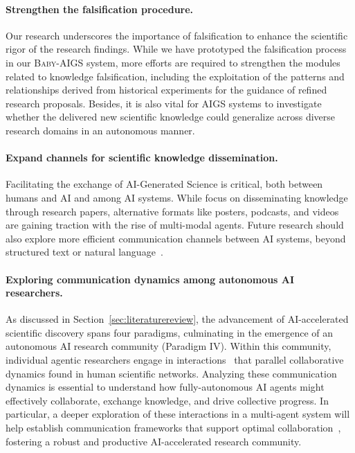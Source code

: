 \documentclass{article} %
\newcommand{\AIGSFull}{AI-Generated Science\xspace}
\newcommand{\AIGS}{AIGS\xspace}
\newcommand{\AIGSSys}{\textsc{Baby-AIGS}\xspace}
\begin{document}
\paragraph{Strengthen the falsification procedure.}
Our research underscores the importance of falsification to enhance the scientific rigor of the research findings.
While we have prototyped the falsification process in our \AIGSSys system, more efforts are required to strengthen the modules related to knowledge falsification, including the exploitation of the patterns and relationships derived from historical experiments for the guidance of refined research proposals.
Besides, it is also vital for \AIGS systems to investigate whether the delivered new scientific knowledge could generalize across diverse research domains in an autonomous manner.

\paragraph{Expand channels for scientific knowledge dissemination.}
Facilitating the exchange of \AIGSFull is critical, both between humans and AI and among AI systems.
While \citet{lu2024aiscientist} focus on disseminating knowledge through research papers, alternative formats like posters, podcasts, and videos are gaining traction with the rise of multi-modal agents.
Future research should also explore more efficient communication channels between AI systems, beyond structured text or natural language~\citep{pham2023let,chen2024beyond}.

\paragraph{Exploring communication dynamics among autonomous AI researchers.}
As discussed in Section~\ref{sec:literaturereview}, the advancement of AI-accelerated scientific discovery spans four paradigms, culminating in the emergence of an autonomous AI research community (Paradigm IV).
Within this community, individual agentic researchers engage in interactions~\citep{yang2024react} that parallel collaborative dynamics found in human scientific networks.
Analyzing these communication dynamics is essential to understand how fully-autonomous AI agents might effectively collaborate, exchange knowledge, and drive collective progress.
In particular, a deeper exploration of these interactions in a multi-agent system will help establish communication frameworks that support optimal collaboration~\citep{liu2024a}, fostering a robust and productive AI-accelerated research community.
\end{document}
